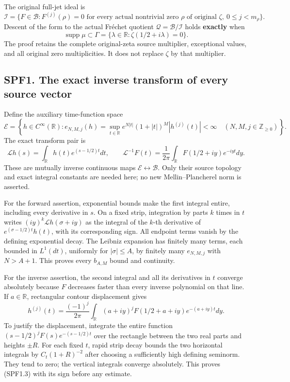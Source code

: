 The original full-jet ideal is \[
\mathcal I=\{F\in\mathcal B:F^{(j)}(\rho)=0
\text{ for every actual nontrivial zero }\rho\text{ of original }\zeta,
\ 0\le j<m_\rho\}.
\tag{SPF0.5}
\] Descent of the form to the actual Fréchet quotient
\(\mathcal Q=\mathcal B/\mathcal I\) holds \textbf{exactly} when \[
\boxed{\operatorname{supp}\mu\subset
\Gamma=\{\lambda\in\mathbb R:\zeta(1/2+i\lambda)=0\}.}
\tag{SPF0.6}
\] The proof retains the complete original-zeta source multiplier,
exceptional values, and all original zero multiplicities. It does not
replace \(\zeta\) by that multiplier.

\subsection{SPF1. The exact inverse transform of every source
vector}\label{spf1.-the-exact-inverse-transform-of-every-source-vector}

Define the auxiliary time-function space \[
\mathcal E=\left\{h\in C^\infty(\mathbb R):
e_{N,M,j}(h)=\sup_{t\in\mathbb R}
e^{N|t|}(1+|t|)^M|h^{(j)}(t)|<\infty
\quad(N,M,j\in\mathbb Z_{\ge0})\right\}.
\tag{SPF1.1}
\] The exact transform pair is \[
\mathcal Lh(s)=\int_{\mathbb R}h(t)e^{(s-1/2)t}dt,
\qquad
\mathcal L^{-1}F(t)=\frac1{2\pi}
\int_{\mathbb R}F(1/2+iy)e^{-iyt}dy.
\tag{SPF1.2}
\] These are mutually inverse continuous maps
\(\mathcal E\leftrightarrow\mathcal B\). Only their source topology and
exact integral constants are needed here; no new Mellin--Plancherel norm
is asserted.

For the forward assertion, exponential bounds make the first integral
entire, including every derivative in \(s\). On a fixed strip,
integration by parts \(k\) times in \(t\) writes
\((iy)^k\mathcal Lh(\sigma+iy)\) as the integral of the \(k\)-th
derivative of \(e^{(\sigma-1/2)t}h(t)\), with its corresponding sign.
All endpoint terms vanish by the defining exponential decay. The Leibniz
expansion has finitely many terms, each bounded in \(L^1(dt)\),
uniformly for \(|\sigma|\le A\), by finitely many \(e_{N,M,j}\) with
\(N>A+1\). This proves every \(b_{A,M}\) bound and continuity.

For the inverse assertion, the second integral and all its derivatives
in \(t\) converge absolutely because \(F\) decreases faster than every
inverse polynomial on that line. If \(a\in\mathbb R\), rectangular
contour displacement gives \[
h^{(j)}(t)=\frac{(-1)^j}{2\pi}
\int_{\mathbb R}(a+iy)^jF(1/2+a+iy)e^{-(a+iy)t}dy.
\tag{SPF1.3}
\] To justify the displacement, integrate the entire function
\((s-1/2)^jF(s)e^{-(s-1/2)t}\) over the rectangle between the two real
parts and heights \(\pm R\). For each fixed \(t\), rapid strip decay
bounds the two horizontal integrals by \(C_t(1+R)^{-2}\) after choosing
a sufficiently high defining seminorm. They tend to zero; the vertical
integrals converge absolutely. This proves (SPF1.3) with its sign before
any estimate.

